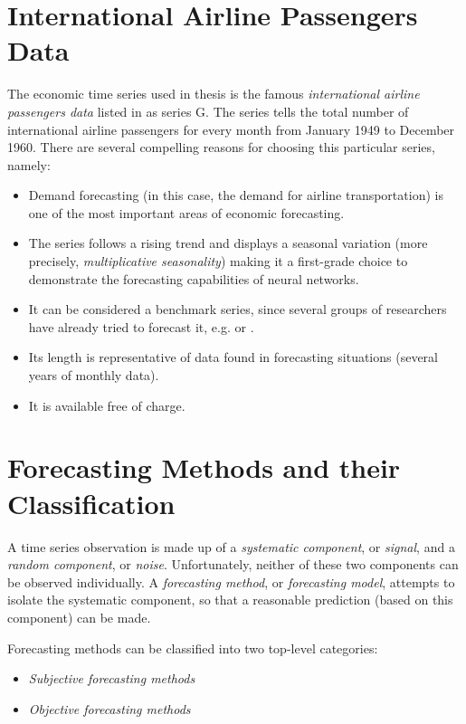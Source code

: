 \section{International Airline Passengers Data}

The economic time series used in thesis is the famous \textit{international airline passengers data} listed in \cite{Box94} as series G. The series tells the total number of international airline passengers for every month from January 1949 to December 1960. There are several compelling reasons for choosing this particular series, namely:

\begin{itemize}
\item Demand forecasting (in this case, the demand for airline transportation) is one of the most important areas of economic forecasting.
\item The series follows a rising trend and displays a seasonal variation (more precisely, \textit{multiplicative seasonality}) making it a first-grade choice to demonstrate the forecasting capabilities of neural networks.
\item It can be considered a benchmark series, since several groups of researchers have already tried to forecast it, e.g. \cite{Tang91} or \cite{Faraway97}.
\item Its length is representative of data found in forecasting situations (several years of monthly data).
\item It is available free of charge.
\end{itemize}

\section{Forecasting Methods and their Classification}

A time series observation is made up of a \textit{systematic component}, or \textit{signal}, and a \textit{random component}, or \textit{noise}. Unfortunately, neither of these two components can be observed individually. A \textit{forecasting method}, or \textit{forecasting model}, attempts to isolate the systematic component, so that a reasonable prediction (based on this component) can be made.

Forecasting methods can be classified into two top-level categories:

\begin{itemize}
\item \textit{Subjective forecasting methods}
\item \textit{Objective forecasting methods}
\end{itemize}


